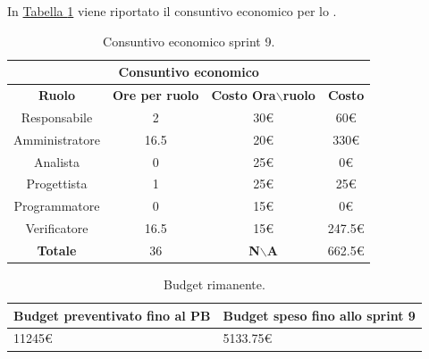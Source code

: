 In \hyperref[tab:sprint9_consuntivo_economico]{Tabella \ref{tab:sprint9_consuntivo_economico}} viene riportato il consuntivo economico per lo .
\begin{table}[H]
    \centering
    \begin{tabular}{|c|c|c|c|}
        \hline
            \multicolumn{4}{|c|}{\textbf{Consuntivo economico}} \\ 
        \hline
            \textbf{Ruolo} & \textbf{Ore per ruolo} & \textbf{Costo Ora$\backslash$ruolo} & \textbf{Costo} \\
        \hline
        Responsabile & 2 & 30€ & 60€ \\
        \hline
        Amministratore & 16.5 & 20€ & 330€ \\
        \hline
        Analista & 0 & 25€ & 0€ \\
        \hline
        Progettista & 1 & 25€ & 25€ \\
        \hline
        Programmatore & 0 & 15€ & 0€ \\
        \hline
        Verificatore & 16.5 & 15€ & 247.5€ \\
        \hline 
        \textbf{Totale} & 36 & \textbf{N$\backslash$A} & 662.5€  \\
        \hline
    \end{tabular}
    \caption{Consuntivo economico sprint 9.}
    \label{tab:sprint9_consuntivo_economico}
\end{table}

\begin{table}[H]
    \centering
    \begin{tabular}{| l | l |}
    \hline
    \textbf{Budget preventivato fino al PB} & \textbf{Budget speso fino allo sprint 9}\\
    \hline
        11245€ & 5133.75€ \\
    \hline
    \end{tabular}
    \caption{Budget rimanente.}
    \label{tab:budget_rimanente_sprint9}
\end{table}